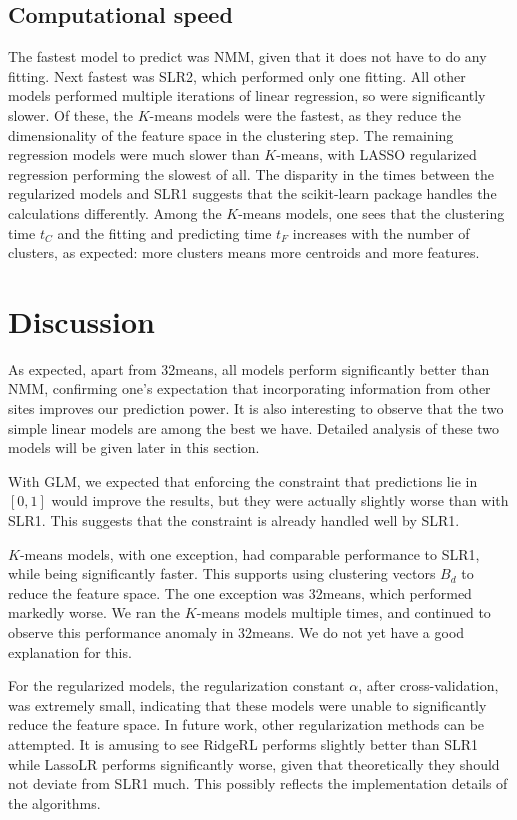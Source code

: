 \documentclass{article} %
\begin{document}
\subsection{Computational speed}
The fastest model to predict was NMM, given that it does not have to do any fitting. Next fastest was SLR2, which performed only one fitting. All other models performed multiple iterations of linear regression, so were significantly slower. Of these, the $K$-means models were the fastest, as they reduce the dimensionality of the feature space in the clustering step. The remaining regression models were much slower than $K$-means, with LASSO regularized regression performing the slowest of all. The disparity in the times between the regularized models and SLR1 suggests that the scikit-learn package handles the calculations differently. Among the $K$-means models, one sees that the clustering time $t_C$ and the fitting and predicting time $t_F$ increases with the number of clusters, as expected: more clusters means more centroids and more features.

\section{Discussion}
As expected, apart from 32means, all models perform significantly better than NMM, confirming one's expectation that incorporating information from other sites improves our prediction power. It is also interesting to observe that the two simple linear models are among the best we have. Detailed analysis of these two models will be given later in this section.

With GLM, we expected that enforcing the constraint that predictions lie in $[0,1]$ would improve the results, but they were actually slightly worse than with SLR1. This suggests that the constraint is already handled well by SLR1.

$K$-means models, with one exception, had comparable performance to SLR1, while being significantly faster. This supports using clustering vectors $B_d$ to reduce the feature space. The one exception was 32means, which performed markedly worse. We ran the $K$-means models multiple times, and continued to observe this performance anomaly in 32means. We do not yet have a good explanation for this.

For the regularized models, the regularization constant $\alpha$, after cross-validation, was extremely small, indicating that these models were unable to significantly reduce the feature space. In future work, other regularization methods can be attempted. It is amusing to see RidgeRL performs slightly better than SLR1 while LassoLR performs significantly worse, given that theoretically they should not deviate from SLR1 much. This possibly reflects the implementation details of the algorithms.
\end{document}
